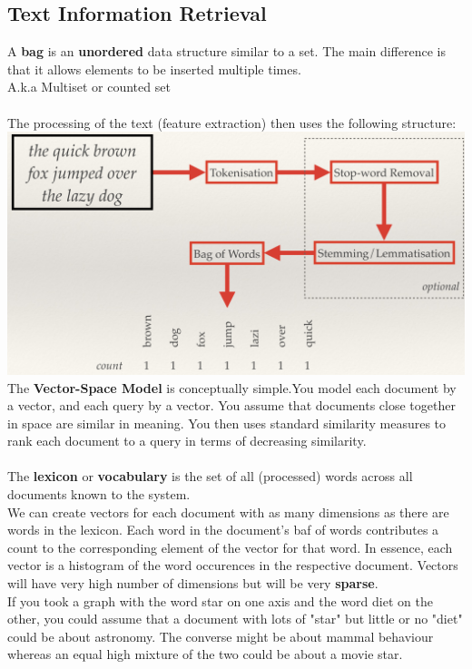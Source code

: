 \documentclass{article}
\begin{document}
	\subsection*{Text Information Retrieval}
	A {\bfseries bag} is an {\bfseries unordered} data structure similar to a set. The main difference is that it allows elements to be inserted multiple times.\\
	A.k.a Multiset or counted set\\
	\\The processing of the text (feature extraction) then uses the following structure:\\
	\includegraphics[scale=0.33]{text_processing}
	The {\bfseries Vector-Space Model} is conceptually simple.You model each document by a vector, and each query by a vector. You assume that documents close together in space are similar in meaning. You then uses standard similarity measures to rank each document to a query in terms of decreasing similarity.\\
	\\The {\bfseries lexicon} or {\bfseries vocabulary} is the set of all (processed) words across all documents known to the system.\\
	We can create vectors for each document with as many dimensions as there are words in the lexicon. Each word in the document's baf of words contributes a count to the corresponding element of the vector for that word. In essence, each vector is a histogram of the word occurences in the respective document. Vectors will have very high number of dimensions but will be very {\bfseries sparse}.\\
	If you took a graph with the word star on one axis and the word diet on the other, you could assume that a document with lots of "star" but little or no "diet" could be about astronomy. The converse might be about mammal behaviour whereas an equal high mixture of the two could be about a movie star.\\
\end{document}
